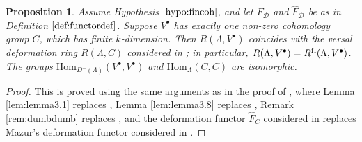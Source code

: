 \documentclass{amsart}
\theoremstyle{plain}
\newtheorem{prop}[thm]{Proposition}
\theoremstyle{definition}
\theoremstyle{remark}
\begin{document}
\begin{prop}
\label{prop:modulecase}
Assume Hypothesis $\ref{hypo:fincoh}$, and let ${F}_{\mathcal{D}}$ and
$\hat{F}_{\mathcal{D}}$ be as in Definition $\ref{def:functordef}$.
Suppose $V^\bullet$ has exactly one non-zero cohomology group $C$, which has finite 
$k$-dimension. Then
$R(\Lambda,V^\bullet)$ coincides with the versal deformation ring $R(\Lambda,C)$ considered
in \cite{blehervelez}; in particular, $R(\Lambda,V^\bullet)=R^{\mathrm{f\/l}}(\Lambda,V^\bullet)$.
The groups $\mathrm{Hom}_{D^-(\Lambda)}(V^\bullet,V^\bullet)$
and  $\mathrm{Hom}_{\Lambda}(C,C)$ are isomorphic.
\end{prop}

\begin{proof}
This is proved using the same arguments as in the proof of 
\cite[Prop. 9.1]{bcderived}, where
Lemma \ref{lem:lemma3.1} replaces \cite[Lemma 3.1]{bcderived},
Lemma \ref{lem:lemma3.8} replaces \cite[Lemma 3.8]{bcderived}, 
Remark \ref{rem:dumbdumb} replaces \cite[Remark 2.6]{bcderived}, and
the deformation functor $\hat{F}_C$ considered in \cite{blehervelez} replaces Mazur's deformation functor
considered in \cite{Maz}.
\end{proof}
\end{document}
